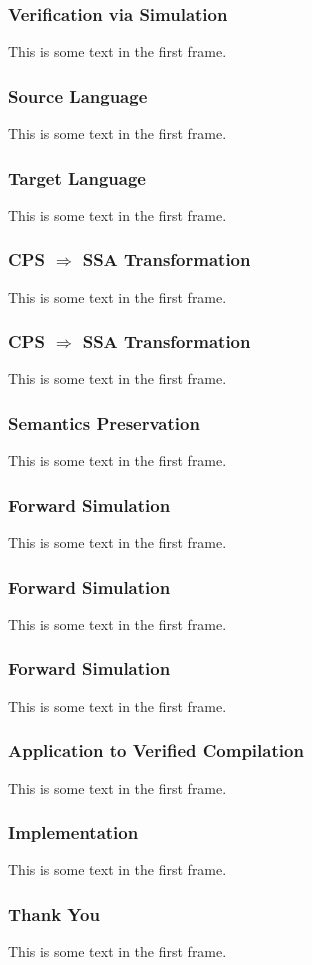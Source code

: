 \documentclass[xcolor={dvipsnames}]{beamer}
\begin{document}
\begin{frame}
\frametitle{Verification via Simulation}
This is some text in the first frame.
\end{frame}

\begin{frame}
\frametitle{Source Language}
This is some text in the first frame.
\end{frame}

\begin{frame}
\frametitle{Target Language}
This is some text in the first frame.
\end{frame}

\begin{frame}
\frametitle{CPS $\Rightarrow$ SSA Transformation}
This is some text in the first frame.
\end{frame}

\begin{frame}
\frametitle{CPS $\Rightarrow$ SSA Transformation}
This is some text in the first frame.
\end{frame}

\begin{frame}
\frametitle{Semantics Preservation}
This is some text in the first frame.
\end{frame}

\begin{frame}
\frametitle{Forward Simulation}
This is some text in the first frame.
\end{frame}

\begin{frame}
\frametitle{Forward Simulation}
This is some text in the first frame.
\end{frame}

\begin{frame}
\frametitle{Forward Simulation}
This is some text in the first frame.
\end{frame}

\begin{frame}
\frametitle{Application to Verified Compilation}
This is some text in the first frame.
\end{frame}

\begin{frame}
\frametitle{Implementation}
This is some text in the first frame.
\end{frame}

\begin{frame}
\frametitle{Thank You}
This is some text in the first frame.
\end{frame}
\end{document}
